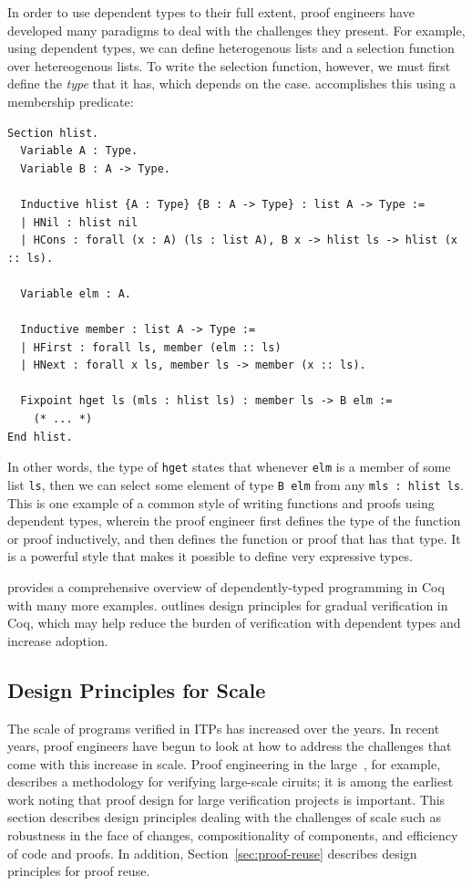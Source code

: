 In order to use dependent types to their full extent, proof engineers have developed many
paradigms to deal with the challenges they present.
For example, using dependent types, we can define heterogenous lists and a selection function
over hetereogenous lists. To write the selection function, however, we must first define
the \textit{type} that it has, which depends on the case. \cite{CPDT} accomplishes this
using a membership predicate:
\begin{lstlisting}
Section hlist.
  Variable A : Type.
  Variable B : A -> Type.

  Inductive hlist {A : Type} {B : A -> Type} : list A -> Type :=
  | HNil : hlist nil
  | HCons : forall (x : A) (ls : list A), B x -> hlist ls -> hlist (x :: ls).

  Variable elm : A.

  Inductive member : list A -> Type :=
  | HFirst : forall ls, member (elm :: ls)
  | HNext : forall x ls, member ls -> member (x :: ls).

  Fixpoint hget ls (mls : hlist ls) : member ls -> B elm :=
    (* ... *)
End hlist.
\end{lstlisting}
In other words, the type of \lstinline{hget} states that whenever \lstinline{elm} is a member of some list \lstinline{ls},
then we can select some element of type \lstinline{B elm} from any \lstinline{mls : hlist ls}.
This is one example of a common style of writing functions and proofs using dependent types,
wherein the proof engineer first defines the type of the function or proof inductively,
and then defines the function or proof that has that type.
It is a powerful style that makes it possible to define very expressive types.

\cite{CPDT} provides a comprehensive overview
of dependently-typed programming in Coq with many more examples.
\cite{Tanter2015} outlines design principles for gradual verification in Coq,
which may help reduce the burden of verification with dependent types and increase adoption. %

\subsection{Design Principles for Scale}
\label{sec:des-scale}

The scale of programs verified in ITPs has increased over the years.
In recent years, proof engineers have begun to look at how to address the challenges that come with this increase in scale.
Proof engineering in the large~\citep{Kaivola2003}, for example, describes a methodology
for verifying large-scale ciruits; it is among the earliest work
noting that proof design for large verification projects is important.
This section describes design principles dealing with the challenges of scale such as
robustness in the face of changes, compositionality of components, and efficiency of code and proofs.
In addition, Section~\ref{sec:proof-reuse} describes design principles for proof reuse.

